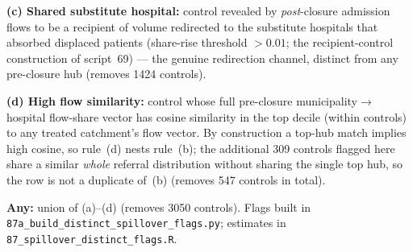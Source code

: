 \begin{table}[!htbp]
\begin{threeparttable}
\begin{tablenotes}[flushleft]
\item \textbf{(c) Shared substitute hospital:} control revealed by \emph{post}-closure admission flows to be a recipient of volume redirected to the substitute hospitals that absorbed displaced patients (share-rise threshold $>0.01$; the recipient-control construction of script~69) --- the genuine redirection channel, distinct from any pre-closure hub (removes 1424 controls).
\item \textbf{(d) High flow similarity:} control whose full pre-closure municipality$\to$hospital flow-share vector has cosine similarity in the top decile (within controls) to any treated catchment's flow vector. By construction a top-hub match implies high cosine, so rule~(d) nests rule~(b); the additional 309 controls flagged here share a similar \emph{whole} referral distribution without sharing the single top hub, so the row is not a duplicate of~(b) (removes 547 controls in total).
\item \textbf{Any:} union of (a)--(d) (removes 3050 controls). Flags built in \texttt{87a\_build\_distinct\_spillover\_flags.py}; estimates in \texttt{87\_spillover\_distinct\_flags.R}.
\end{tablenotes}
\end{threeparttable}
\end{table}
